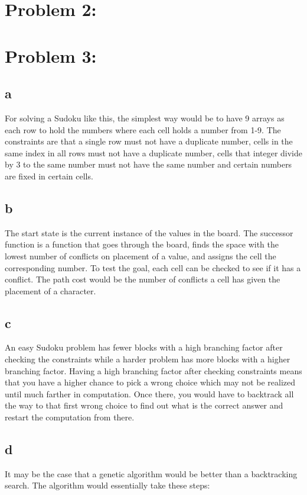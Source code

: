 \documentclass[11pt, oneside]{article}   	%
\begin{document}
\begin{flushleft}
\section*{Problem 2:}
\section*{Problem 3:}
\subsection*{a}
For solving a Sudoku like this, the simplest way would be to have 9 arrays as each row to hold the numbers where each cell holds a number from 1-9. The constraints are that a single row must not have a duplicate number, cells in the same index in all rows must not have a duplicate number, cells that integer divide by 3 to the same number must not have the same number and certain numbers are fixed in certain cells.
\subsection*{b}
The start state is the current instance of the values in the board. The successor function is a function that goes through the board, finds the space with the lowest number of conflicts on placement of a value, and assigns the cell the corresponding number. To test the goal, each cell can be checked to see if it has a conflict. The path cost would be the number of conflicts a cell has given the placement of a character.
\subsection*{c}
An easy Sudoku problem has fewer blocks with a high branching factor after checking the constraints while a harder problem has more blocks with a higher branching factor. Having a high branching factor after checking constraints means that you have a higher chance to pick a wrong choice which may not be realized until much farther in computation. Once there, you would have to backtrack all the way to that first wrong choice to find out what is the correct answer and restart the computation from there.
\subsection*{d}
It may be the case that a genetic algorithm would be better than a backtracking search. The algorithm would essentially take these steps:
\pagebreak
\begin{program}
\BEGIN \\


\end{program}
\end{flushleft}
\end{document}

